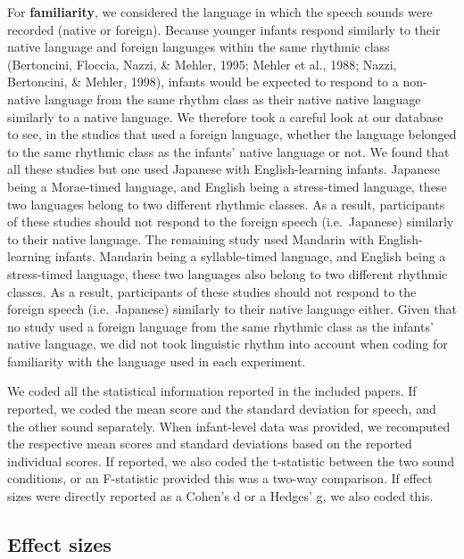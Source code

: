 \documentclass[
  man,mask,floatsintext]{apa6}
\begin{document}
For \textbf{familiarity}, we considered the language in which the speech sounds were recorded (native or foreign). Because younger infants respond similarly to their native language and foreign languages within the same rhythmic class (Bertoncini, Floccia, Nazzi, \& Mehler, 1995; Mehler et al., 1988; Nazzi, Bertoncini, \& Mehler, 1998), infants would be expected to respond to a non-native language from the same rhythm class as their native native language similarly to a native language. We therefore took a careful look at our database to see, in the studies that used a foreign language, whether the language belonged to the same rhythmic class as the infants' native language or not. We found that all these studies but one used Japanese with English-learning infants. Japanese being a Morae-timed language, and English being a stress-timed language, these two languages belong to two different rhythmic classes. As a result, participants of these studies should not respond to the foreign speech (i.e.~Japanese) similarly to their native language. The remaining study used Mandarin with English-learning infants. Mandarin being a syllable-timed language, and English being a stress-timed language, these two languages also belong to two different rhythmic classes. As a result, participants of these studies should not respond to the foreign speech (i.e.~Japanese) similarly to their native language either. Given that no study used a foreign language from the same rhythmic class as the infants' native language, we did not took linguistic rhythm into account when coding for familiarity with the language used in each experiment.

We coded all the statistical information reported in the included papers. If reported, we coded the mean score and the standard deviation for speech, and the other sound separately. When infant-level data was provided, we recomputed the respective mean scores and standard deviations based on the reported individual scores. If reported, we also coded the t-statistic between the two sound conditions, or an F-statistic provided this was a two-way comparison. If effect sizes were directly reported as a Cohen's d or a Hedges' g, we also coded this.

\hypertarget{effect-sizes}{%
\subsection{Effect sizes}\label{effect-sizes}}
\end{document}
